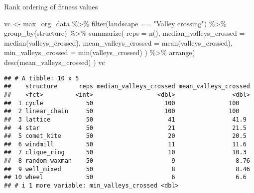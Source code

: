 \documentclass[
]{book}
\newenvironment{Shaded}{\begin{snugshade}}{\end{snugshade}}
\newcommand{\AttributeTok}[1]{\textcolor[rgb]{0.77,0.63,0.00}{#1}}
\newcommand{\FunctionTok}[1]{\textcolor[rgb]{0.00,0.00,0.00}{#1}}
\newcommand{\NormalTok}[1]{#1}
\newcommand{\OtherTok}[1]{\textcolor[rgb]{0.56,0.35,0.01}{#1}}
\newcommand{\SpecialCharTok}[1]{\textcolor[rgb]{0.00,0.00,0.00}{#1}}
\newcommand{\StringTok}[1]{\textcolor[rgb]{0.31,0.60,0.02}{#1}}
\begin{document}
Rank ordering of fitness values

\begin{Shaded}
\begin{Highlighting}[]
\NormalTok{vc }\OtherTok{\textless{}{-}}\NormalTok{ max\_org\_data }\SpecialCharTok{\%\textgreater{}\%}
  \FunctionTok{filter}\NormalTok{(landscape }\SpecialCharTok{==} \StringTok{"Valley crossing"}\NormalTok{) }\SpecialCharTok{\%\textgreater{}\%}
  \FunctionTok{group\_by}\NormalTok{(structure) }\SpecialCharTok{\%\textgreater{}\%}
  \FunctionTok{summarize}\NormalTok{(}
    \AttributeTok{reps =} \FunctionTok{n}\NormalTok{(),}
    \AttributeTok{median\_valleys\_crossed =} \FunctionTok{median}\NormalTok{(valleys\_crossed),}
    \AttributeTok{mean\_valleys\_crossed =} \FunctionTok{mean}\NormalTok{(valleys\_crossed),}
    \AttributeTok{min\_valleys\_crossed =} \FunctionTok{min}\NormalTok{(valleys\_crossed)}
\NormalTok{  ) }\SpecialCharTok{\%\textgreater{}\%}
  \FunctionTok{arrange}\NormalTok{(}
    \FunctionTok{desc}\NormalTok{(mean\_valleys\_crossed)}
\NormalTok{  )}
\NormalTok{vc}
\end{Highlighting}
\end{Shaded}

\begin{verbatim}
## # A tibble: 10 x 5
##    structure      reps median_valleys_crossed mean_valleys_crossed
##    <fct>         <int>                  <dbl>                <dbl>
##  1 cycle            50                    100               100   
##  2 linear_chain     50                    100               100   
##  3 lattice          50                     41                41.9 
##  4 star             50                     21                21.5 
##  5 comet_kite       50                     20                20.5 
##  6 windmill         50                     11                11.6 
##  7 clique_ring      50                     10                10.3 
##  8 random_waxman    50                      9                 8.76
##  9 well_mixed       50                      8                 8.46
## 10 wheel            50                      6                 6.6 
## # i 1 more variable: min_valleys_crossed <dbl>
\end{verbatim}

\begin{Shaded}
\end{Shaded}
\end{document}
